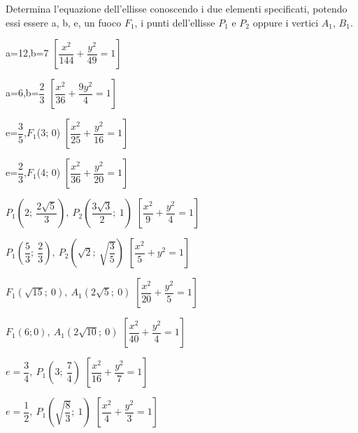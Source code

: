 \subsubsection*{}

\begin{esercizio}
  \label{ese:div.003}
  Determina l'equazione dell'ellisse conoscendo i due elementi 
specificati, potendo essi essere a, b, e, un fuoco \( F_{1}\), i punti 
dell'ellisse \( P_{1} \) e \( P_{2} \) oppure i vertici \( A_{1} \), \( B_{1} \).
  \begin{enumeratea}
   \item a=12,\quad b=7
   \hfill \(\left[ \dfrac{x^{2}}{144} + \dfrac{y^{2}}{49} =1\right]\)
   \item a=6,\quad b=\( \dfrac{2}{3} \)
   \hfill \(\left[ \dfrac{x^{2}}{36} + \dfrac{9y^{2}}{4} =1\right]\)
   \item e=\( \dfrac{3}{5} \),\quad \( F_{1}\)(3; 0)
   \hfill \(\left[ \dfrac{x^{2}}{25} + \dfrac{y^{2}}{16} =1\right]\)
   \item e=\( \dfrac{2}{3} \),\quad \( F_{1}\)(4; 0)
   \hfill \(\left[ \dfrac{x^{2}}{36} + \dfrac{y^{2}}{20} =1\right]\)
   \item \( P_{1}  \left(2; ~ \dfrac{2\sqrt{5}}{3} \right),~  P_{2} \left( 
\dfrac{3\sqrt{3}}{2}; ~ 1\right)\)
   \hfill \(\left[ \dfrac{x^{2}}{9} + \dfrac{y^{2}}{4} =1\right]\)
   \item \( P_{1} \left( \dfrac{5}{3} ; ~ \dfrac{2}{3} \right), ~  P_{2} 
\left( \sqrt{2} ; ~ \sqrt{\dfrac{3}{5}} \right)\)
   \hfill \(\left[ \dfrac{x^{2}}{5} + y^{2} =1\right]\)
   \item \( F_{1}\left( \sqrt{15} ;~ 0\right),~ A_{1}\left(2 \sqrt{5} ;~ 
0\right)\)
   \hfill \(\left[\dfrac{x^{2}}{20} + \dfrac{y^{2}}{5} =1\right]\)
   \item \( F_{1}(6; 0),~ A_{1}\left(2 \sqrt{10} ; ~0\right)\)
   \hfill \(\left[ \dfrac{x^{2}}{40} + \dfrac{y^{2}}{4} =1\right]\)
   \item  \(e= \dfrac{3}{4} ,~ P_{1}\left(3; ~ \dfrac{7}{4} \right)\)
   \hfill  \(\left[ \dfrac{x^{2}}{16} + \dfrac{y^{2}}{7} =1\right]\)
   \item \(e= \dfrac{1}{2} ,~ P_{1}\left( \sqrt{\dfrac{8}{3}} ;~ 1\right)\)
   \hfill \(\left[ \dfrac{x^{2}}{4} + \dfrac{y^{2}}{3} =1\right]\)
  
  \end{enumeratea}
\end{esercizio}

% 
% 
